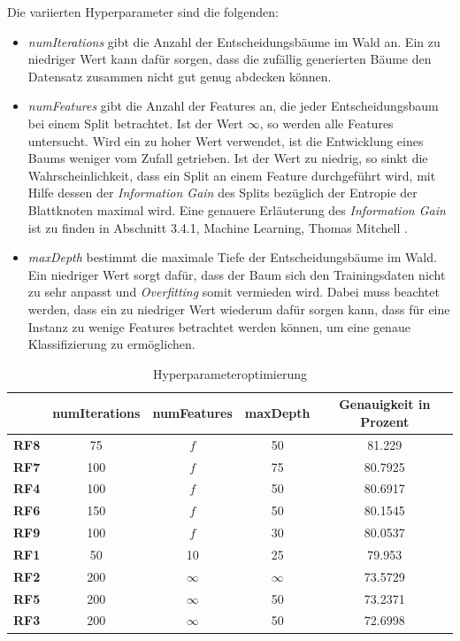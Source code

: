 Die variierten Hyperparameter sind die folgenden:

\begin{itemize}
	\item \textit{numIterations} gibt die Anzahl der Entscheidungsbäume im Wald an. Ein zu niedriger Wert kann dafür sorgen, dass die zufällig generierten Bäume den Datensatz zusammen nicht gut genug abdecken können.
	\item \textit{numFeatures} gibt die Anzahl der Features an, die jeder Entscheidungsbaum bei einem Split betrachtet. Ist der Wert $\infty$, so werden alle Features untersucht. Wird ein zu hoher Wert verwendet, ist die Entwicklung eines Baums weniger vom Zufall getrieben. Ist der Wert zu niedrig, so sinkt die Wahrscheinlichkeit, dass ein Split an einem Feature durchgeführt wird, mit Hilfe dessen der \textit{Information Gain} des Splits bezüglich der Entropie der Blattknoten maximal wird. Eine genauere Erläuterung des \textit{Information Gain} ist zu finden in Abschnitt 3.4.1, Machine Learning, Thomas Mitchell \cite{Mitchell1997}.
	\item \textit{maxDepth} bestimmt die maximale Tiefe der Entscheidungsbäume im Wald. Ein niedriger Wert sorgt dafür, dass der Baum sich den Trainingsdaten nicht zu sehr anpasst und \textit{Overfitting} somit vermieden wird. Dabei muss beachtet werden, dass ein zu niedriger Wert wiederum dafür sorgen kann, dass für eine Instanz zu wenige Features betrachtet werden können, um eine genaue Klassifizierung zu ermöglichen.
\end{itemize}

\begin{table}[h]
	\centering
	\begin{tabular}{|c|c|c|c||c|}
		\hline 
		& \textbf{numIterations} & \textbf{numFeatures} & \textbf{maxDepth} & \textbf{Genauigkeit in Prozent} \\ 
		\hline 
		\textbf{RF8} & 75 & $f$ & 50 & 81.229 \\ 
		\hline 
		\textbf{RF7} & 100 & $f$ & 75 & 80.7925 \\ 
		\hline 
		\textbf{RF4} & 100 & $f$ & 50 & 80.6917 \\ 
		\hline 
		\textbf{RF6} & 150 & $f$ & 50 & 80.1545 \\ 
		\hline 
		\textbf{RF9} & 100 & $f$ & 30 & 80.0537 \\ 
		\hline 
		\textbf{RF1} & 50 & 10 & 25 & 79.953 \\ 
		\hline 
		\textbf{RF2} & 200 & $\infty$ & $\infty$ & 73.5729 \\ 
		\hline 
		\textbf{RF5} & 200 & $\infty$ & 50 & 73.2371 \\ 
		\hline 
		\textbf{RF3} & 200 & $\infty$ & 50 & 72.6998 \\ 
		\hline
	\end{tabular}
	\caption{Hyperparameteroptimierung}
	\label{tab:hyperparam-opt}
\end{table}

